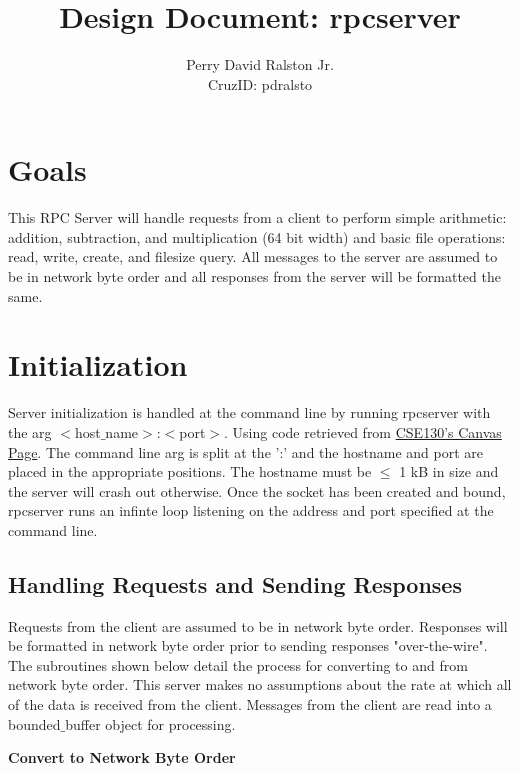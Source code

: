\documentclass[11pt,letterpaper]{article}
\title{Design Document: rpcserver}
\author{Perry David Ralston Jr.\\ CruzID: pdralsto}
\begin{document}
\maketitle
\thispagestyle{fancy}
\section{Goals}

This RPC Server will handle requests from a client to perform simple arithmetic: addition, subtraction, and multiplication (64 bit width) and basic file operations: read, write, create, and filesize query. All messages to the server are assumed to be in network byte order and all responses from the server will be formatted the same.
\section{Initialization}

Server initialization is handled at the command line by running rpcserver with the arg $<$host$\_$name$>$:$<$port$>$. Using code retrieved from \href{https://canvas.ucsc.edu/courses/36179/pages/setting-up-sockets-for-basic-client-slash-server-stream-communication}{CSE130's Canvas Page}. The command line arg is split at the ':' and the hostname and port are placed in the appropriate positions. The hostname must be $\leq$ 1 kB in size and the server will crash out otherwise. Once the socket has been created and bound, rpcserver runs an infinte loop listening on the address and port specified at the command line.
\subsection{Handling Requests and Sending Responses}

Requests from the client are assumed to be in network byte order. Responses will be formatted in network byte order prior to sending responses "over-the-wire". The subroutines shown below detail the process for converting to and from network byte order. This server makes no assumptions about the rate at which all of the data is received from the client. Messages from the client are read into a bounded$\_$buffer object for processing.\\

\begin{minipage}{\linewidth}

\vspace{-.5cm}\begin{center}
\footnotesize{\textbf{Convert to Network Byte Order}}
\end{center}
\end{minipage}\\\\
\end{document}
